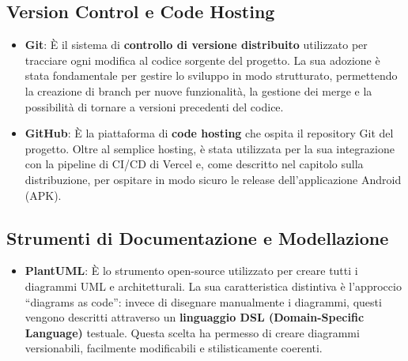 \subsection{Version Control e Code Hosting}\label{subsec:version-control-e-code-hosting}
\begin{itemize}
	\item \textbf{Git}: È il sistema di \textbf{controllo di versione distribuito} utilizzato per tracciare ogni modifica al codice sorgente del progetto.
	La sua adozione è stata fondamentale per gestire lo sviluppo in modo strutturato, permettendo la creazione di branch per nuove funzionalità, la gestione dei merge e la possibilità di tornare a versioni precedenti del codice.
	
	\item \textbf{GitHub}: È la piattaforma di \textbf{code hosting} che ospita il repository Git del progetto.
	Oltre al semplice hosting, è stata utilizzata per la sua integrazione con la pipeline di CI/CD di Vercel e, come descritto nel capitolo sulla distribuzione, per ospitare in modo sicuro le release dell'applicazione Android (APK).
\end{itemize}

\subsection{Strumenti di Documentazione e Modellazione}\label{subsec:strumenti-di-documentazione-e-modellazione}
\begin{itemize}
	\item \textbf{PlantUML}: È lo strumento open-source utilizzato per creare tutti i diagrammi UML e architetturali.
	La sua caratteristica distintiva è l'approccio ``diagrams as code'': invece di disegnare manualmente i diagrammi, questi vengono descritti attraverso un \textbf{linguaggio DSL (Domain-Specific Language)} testuale.
	Questa scelta ha permesso di creare diagrammi versionabili, facilmente modificabili e stilisticamente coerenti.
\end{itemize}